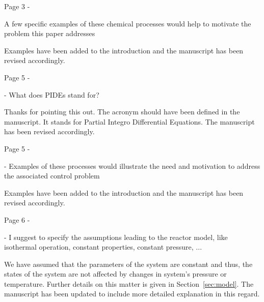 \documentclass[12pt,answers]{exam}
\begin{document}
\begin{questions}

    \question Page 3 - 

    A few specific examples of these chemical processes would help to motivate the problem this paper addresses

    \begin{solutionorbox}
        Examples have been added to the introduction and the manuscript has been revised accordingly.
    \end{solutionorbox}

    \question Page 5 - 

    - What does PIDEs stand for?

    \begin{solutionorbox}
        Thanks for pointing this out. The acronym should have been defined in the manuscript. It stands for Partial Integro Differential Equations. The manuscript has been revised accordingly.
    \end{solutionorbox}


    \question Page 5 - 

    - Examples of these processes would illustrate the need and motivation to address the associated
    control problem

    \begin{solutionorbox}
        Examples have been added to the introduction and the manuscript has been revised accordingly.
    \end{solutionorbox}


    \question Page 6 - 

    - I suggest to specify the assumptions leading to the reactor model, like isothermal operation,
    constant properties, constant pressure, ...

    \begin{solutionorbox}
        We have assumed that the parameters of the system are constant and thus, the states of the system are not affected by changes in system's pressure or temperature. Further details on this matter is given in Section~\ref{sec:model}. The manuscript has been updated to include more detailed explanation in this regard.
    \end{solutionorbox}



\end{questions}
\end{document}
